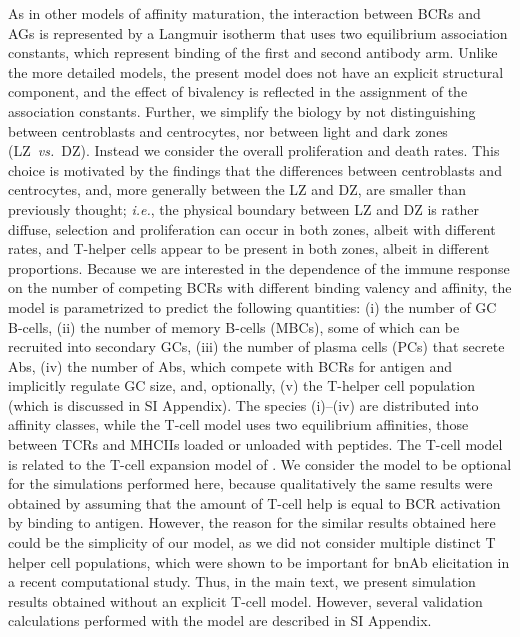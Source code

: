 \documentclass[utf8]{frontiersHLTH}%
\newcommand{\cred}[1]{\textsf{\color{red}#1}}
\newcommand{\vo}[1]{#1} %
\def\ie {{\it i.e.}}
\def\vs {{\it vs.}}
\newcommand{\SI}{SI Appendix}
\begin{document}
As in other models of affinity maturation,\cite{zhang10,wang15} the
interaction between BCRs and AGs is represented by a Langmuir
isotherm that uses two equilibrium association constants, which represent
binding of the first and second antibody arm.  
Unlike the more detailed models,\cite{robert18,amitai20} 
the present model does not have an explicit structural component,
and the effect of bivalency is reflected in the assignment of the association constants.
Further, we simplify the \vo{biology} by not distinguishing between centroblasts and centrocytes, nor
between light and dark zones (LZ~\vs~DZ).  Instead we consider the overall
proliferation and death rates. This choice is motivated by the findings
that the differences between centroblasts and centrocytes, and, more
generally between the LZ and DZ, are smaller than previously
thought;\cite{allen07} \ie, the physical boundary between LZ and DZ is
rather diffuse, selection and proliferation can occur in both zones,
albeit with different rates, and T-helper cells appear to be present in
both zones, albeit in different proportions. Because we are interested
in the dependence of the immune response on the
number of competing BCRs with different binding valency and affinity, the model is parametrized
to \vo{predict} the following quantities: (i) the number of GC B-cells, (ii) the
number of memory
B-cells (MBCs), some of which can be recruited into secondary GCs, (iii) the
number of plasma
cells (PCs) that secrete Abs, (iv) the number of Abs, which compete with BCRs for
antigen and implicitly regulate GC size,\cite{zhang13} and, optionally, (v) the T-helper cell
population (which is discussed in \SI). The species (i)--(iv) are distributed into affinity classes,
while the T-cell model uses two equilibrium affinities, those between TCRs
and MHCIIs loaded or unloaded with peptides. The T-cell model is related
to the T-cell expansion model of \citet{mayer19}.  We consider the model to be 
optional for the simulations performed here, because \cred{qualitatively the
same results were obtained by assuming that the amount of T-cell help is
equal to BCR activation by binding to antigen.  However, the reason for the 
similar results obtained here could be the simplicity of our model, as we did not consider
multiple distinct T helper cell populations, which were shown to be important for bnAb elicitation in a recent computational study.\cite{erwin20}}
%
\cred{Thus, in the main text, we present simulation results obtained without an explicit T-cell model.
However, several validation calculations performed with the model are described in \SI.}
\end{document}
